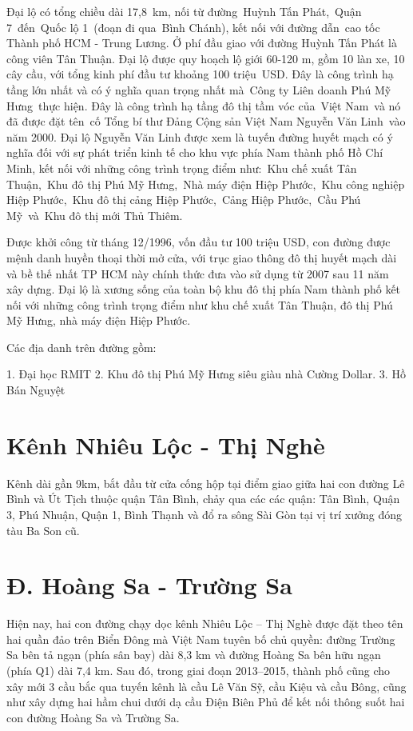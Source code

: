 Đại lộ có tổng chiều dài 17,8 km, nối từ đường Huỳnh Tấn Phát, Quận 7 đến Quốc lộ 1 (đoạn đi qua Bình Chánh), kết nối với đường dẫn cao tốc Thành phố HCM - Trung Lương. Ở phí đầu giao với đường Huỳnh Tấn Phát là công viên Tân Thuận.
Đại lộ được quy hoạch lộ giới 60-120 m, gồm 10 làn xe, 10 cây cầu, với tổng kinh phí đầu tư khoảng 100 triệu USD. Đây là công trình hạ tầng lớn nhất và có ý nghĩa quan trọng nhất mà Công ty Liên doanh Phú Mỹ Hưng thực hiện.
Đây là công trình hạ tầng đô thị tầm vóc của Việt Nam và nó đã được đặt tên cố Tổng bí thư Đảng Cộng sản Việt Nam Nguyễn Văn Linh vào năm 2000.
Đại lộ Nguyễn Văn Linh được xem là tuyến đường huyết mạch có ý nghĩa đối với sự phát triển kinh tế cho khu vực phía Nam thành phố Hồ Chí Minh, kết nối với những công trình trọng điểm như: Khu chế xuất Tân Thuận, Khu đô thị Phú Mỹ Hưng, Nhà máy điện Hiệp Phước, Khu công nghiệp Hiệp Phước, Khu đô thị cảng Hiệp Phước, Cảng Hiệp Phước, Cầu Phú Mỹ và Khu đô thị mới Thủ Thiêm.

Được khởi công từ tháng 12/1996, vốn đầu tư 100 triệu USD, con đường được mệnh danh huyền thoại thời mở cửa, với trục giao thông đô thị huyết mạch dài và bề thế nhất TP HCM này chính thức đưa vào sử dụng từ 2007 sau 11 năm xây dựng. Đại lộ là xương sống của toàn bộ khu đô thị phía Nam thành phố kết nối với những công trình trọng điểm như khu chế xuất Tân Thuận, đô thị Phú Mỹ Hưng, nhà máy điện Hiệp Phước.

Các địa danh trên đường gồm:

1. Đại học RMIT
2. Khu đô thị Phú Mỹ Hưng siêu giàu nhà Cường Dollar.
3. Hồ Bán Nguyệt

\section{Kênh Nhiêu Lộc - Thị Nghè}

Kênh dài gần 9km, bắt đầu từ cửa cống hộp tại điểm giao giữa hai con đường Lê Bình và Út Tịch thuộc quận Tân Bình, chảy qua các các quận: Tân Bình, Quận 3, Phú Nhuận, Quận 1, Bình Thạnh và đổ ra sông Sài Gòn tại vị trí xưởng đóng tàu Ba Son cũ.

\section{Đ. Hoàng Sa - Trường Sa}

Hiện nay, hai con đường chạy dọc kênh Nhiêu Lộc – Thị Nghè được đặt theo tên hai quần đảo trên Biển Đông mà Việt Nam tuyên bố chủ quyền: đường Trường Sa bên tả ngạn (phía sân bay) dài 8,3 km và đường Hoàng Sa bên hữu ngạn (phía Q1) dài 7,4 km. Sau đó, trong giai đoạn 2013–2015, thành phố cũng cho xây mới 3 cầu bắc qua tuyến kênh là cầu Lê Văn Sỹ, cầu Kiệu và cầu Bông, cũng như xây dựng hai hầm chui dưới dạ cầu Điện Biên Phủ để kết nối thông suốt hai con đường Hoàng Sa và Trường Sa.

